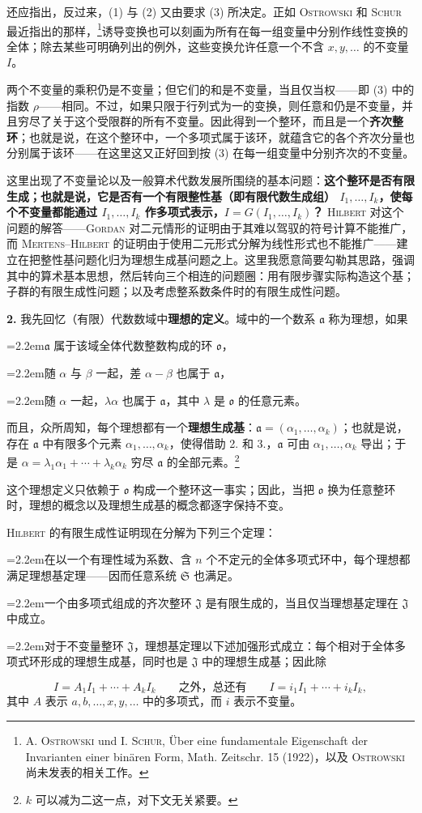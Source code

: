 \documentclass[11pt]{article}
\newcommand{\ma}{\mathfrak a}
\newcommand{\mo}{\mathfrak o}
\newcommand{\mS}{\mathfrak S}
\newcommand{\mJ}{\mathfrak J}
\newcommand{\srcemph}[1]{\textbf{#1}}
\newcommand{\srcname}[1]{\textsc{#1}}
\newcommand{\PXXIIIitem}[2]{\par\noindent\hangindent=2.2em\hangafter=1\makebox[2.2em][l]{#1.}#2\par}
\begin{document}
还应指出，反过来，(1) 与 (2) 又由要求 (3) 所决定。正如 \srcname{Ostrowski} 和 \srcname{Schur} 最近指出的那样，\footnote{A. \textsc{Ostrowski} und I. \textsc{Schur}, Über eine fundamentale Eigenschaft der Invarianten einer binären Form, Math. Zeitschr. 15 (1922)，以及 \textsc{Ostrowski} 尚未发表的相关工作。}诱导变换也可以刻画为所有在每一组变量中分别作线性变换的全体；除去某些可明确列出的例外，这些变换允许任意一个不含 $x,y,\ldots$ 的不变量 $I$。

两个不变量的乘积仍是不变量；但它们的和是不变量，当且仅当权——即 (3) 中的指数 $\rho$——相同。不过，如果只限于行列式为一的变换，则任意和仍是不变量，并且穷尽了关于这个受限群的所有不变量。因此得到一个整环，而且是一个\srcemph{齐次整环}；也就是说，在这个整环中，一个多项式属于该环，就蕴含它的各个齐次分量也分别属于该环——在这里这又正好回到按 (3) 在每一组变量中分别齐次的不变量。

这里出现了不变量论以及一般算术代数发展所围绕的基本问题：\srcemph{这个整环是否有限生成；也就是说，它是否有一个有限整性基（即有限代数生成组） $I_1,\ldots,I_k$，使每个不变量都能通过 $I_1,\ldots,I_k$ 作多项式表示，$I=G(I_1,\ldots,I_k)$？} \srcname{Hilbert} 对这个问题的解答——\srcname{Gordan} 对二元情形的证明由于其难以驾驭的符号计算不能推广，而 \srcname{Mertens--Hilbert} 的证明由于使用二元形式分解为线性形式也不能推广——建立在把整性基问题化归为理想生成基问题之上。这里我愿意简要勾勒其思路，强调其中的算术基本思想，然后转向三个相连的问题圈：用有限步骤实际构造这个基；子群的有限生成性问题；以及考虑整系数条件时的有限生成性问题。

\textbf{2.} 我先回忆（有限）代数数域中\srcemph{理想的定义}。域中的一个数系 $\ma$ 称为理想，如果
\PXXIIIitem{1}{$\ma$ 属于该域全体代数整数构成的环 $\mo$，}
\PXXIIIitem{2}{随 $\alpha$ 与 $\beta$ 一起，差 $\alpha-\beta$ 也属于 $\ma$，}
\PXXIIIitem{3}{随 $\alpha$ 一起，$\lambda\alpha$ 也属于 $\ma$，其中 $\lambda$ 是 $\mo$ 的任意元素。}
而且，众所周知，每个理想都有一个\srcemph{理想生成基}：$\ma=(\alpha_1,\ldots,\alpha_k)$；也就是说，存在 $\ma$ 中有限多个元素 $\alpha_1,\ldots,\alpha_k$，使得借助 2. 和 3.，$\ma$ 可由 $\alpha_1,\ldots,\alpha_k$ 导出；于是 $\alpha=\lambda_1\alpha_1+\cdots+\lambda_k\alpha_k$ 穷尽 $\ma$ 的全部元素。\footnote{$k$ 可以减为二这一点，对下文无关紧要。}

这个理想定义只依赖于 $\mo$ 构成一个整环这一事实；因此，当把 $\mo$ 换为任意整环时，理想的概念以及理想生成基的概念都逐字保持不变。

\srcname{Hilbert} 的有限生成性证明现在分解为下列三个定理：
\PXXIIIitem{1}{在以一个有理性域为系数、含 $n$ 个不定元的全体多项式环中，每个理想都满足理想基定理——因而任意系统 $\mS$ 也满足。}
\PXXIIIitem{2}{一个由多项式组成的齐次整环 $\mJ$ 是有限生成的，当且仅当理想基定理在 $\mJ$ 中成立。}
\PXXIIIitem{3}{对于不变量整环 $\mJ$，理想基定理以下述加强形式成立：每个相对于全体多项式环形成的理想生成基，同时也是 $\mJ$ 中的理想生成基；因此除}
\[
 I=A_1I_1+\cdots+A_kI_k
 \qquad\text{之外，总还有}\qquad
 I=i_1I_1+\cdots+i_kI_k,
\]
其中 $A$ 表示 $a,b,\ldots,x,y,\ldots$ 中的多项式，而 $i$ 表示不变量。
\end{document}
